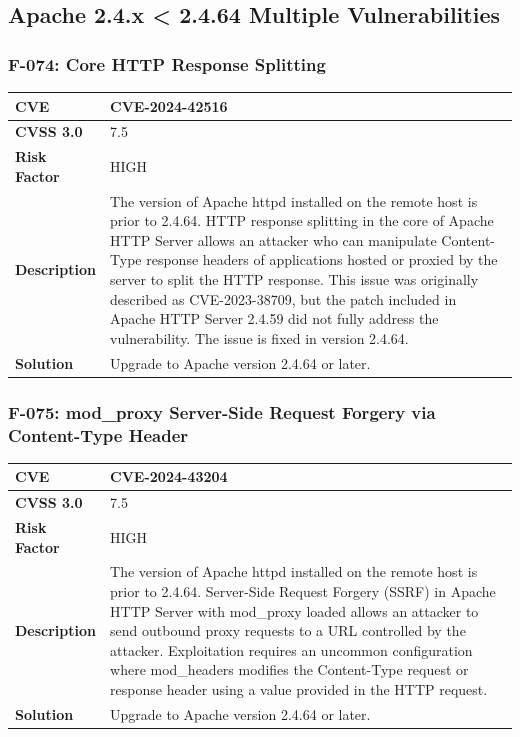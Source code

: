 %
%
\subsection{Apache 2.4.x < 2.4.64 Multiple Vulnerabilities}

\subsubsection{F-074: Core HTTP Response Splitting}
\begin{tabular}{|p{2.8cm}|p{12.2cm}|}
\hline
\textbf{CVE} & CVE-2024-42516 \\ \hline
\textbf{CVSS 3.0} & 7.5 \\ \hline
\textbf{Risk Factor} & HIGH \\ \hline
\textbf{Description} & The version of Apache httpd installed on the remote host is prior to 2.4.64. HTTP response splitting in the core of Apache HTTP Server allows an attacker who can manipulate Content-Type response headers of applications hosted or proxied by the server to split the HTTP response. This issue was originally described as CVE-2023-38709, but the patch included in Apache HTTP Server 2.4.59 did not fully address the vulnerability. The issue is fixed in version 2.4.64. \\ \hline
\textbf{Solution} & Upgrade to Apache version 2.4.64 or later. \\ \hline
\end{tabular}

\subsubsection{F-075: mod\_proxy Server-Side Request Forgery via Content-Type Header}
\begin{tabular}{|p{2.8cm}|p{12.2cm}|}
\hline
\textbf{CVE} & CVE-2024-43204 \\ \hline
\textbf{CVSS 3.0} & 7.5 \\ \hline
\textbf{Risk Factor} & HIGH \\ \hline
\textbf{Description} & The version of Apache httpd installed on the remote host is prior to 2.4.64. Server-Side Request Forgery (SSRF) in Apache HTTP Server with mod\_proxy loaded allows an attacker to send outbound proxy requests to a URL controlled by the attacker. Exploitation requires an uncommon configuration where mod\_headers modifies the Content-Type request or response header using a value provided in the HTTP request. \\ \hline
\textbf{Solution} & Upgrade to Apache version 2.4.64 or later. \\ \hline
\end{tabular}

